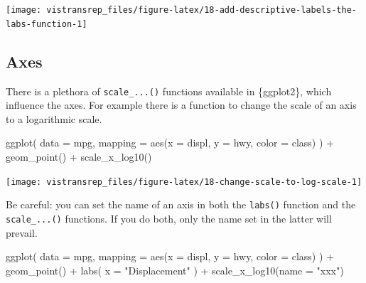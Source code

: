 \documentclass[]{book}
\newenvironment{Shaded}{}{}
\newcommand{\DataTypeTok}[1]{#1}
\newcommand{\KeywordTok}[1]{\textcolor[rgb]{0.00,0.00,1.00}{#1}}
\newcommand{\NormalTok}[1]{#1}
\newcommand{\OperatorTok}[1]{#1}
\newcommand{\StringTok}[1]{\textcolor[rgb]{0.00,0.50,0.50}{#1}}
\begin{document}
\begin{flushright}\texttt{[image: vistransrep\_files/figure-latex/18-add-descriptive-labels-the-labs-function-1]} \end{flushright}

\hypertarget{axes}{%
\subsection{Axes}\label{axes}}

There is a plethora of \texttt{scale\_...()} functions available in \{ggplot2\}, which influence the axes.
For example there is a function to change the scale of an axis to a logarithmic scale.

\begin{Shaded}
\begin{Highlighting}[]
\KeywordTok{ggplot}\NormalTok{(}
  \DataTypeTok{data =}\NormalTok{ mpg,}
  \DataTypeTok{mapping =} \KeywordTok{aes}\NormalTok{(}\DataTypeTok{x =}\NormalTok{ displ, }\DataTypeTok{y =}\NormalTok{ hwy, }\DataTypeTok{color =}\NormalTok{ class)}
\NormalTok{) }\OperatorTok{+}
\StringTok{  }\KeywordTok{geom_point}\NormalTok{() }\OperatorTok{+}
\StringTok{  }\KeywordTok{scale_x_log10}\NormalTok{()}
\end{Highlighting}
\end{Shaded}

\begin{flushright}\texttt{[image: vistransrep\_files/figure-latex/18-change-scale-to-log-scale-1]} \end{flushright}

Be careful: you can set the name of an axis in both the \texttt{labs()} function and the \texttt{scale\_...()} functions.
If you do both, only the name set in the latter will prevail.

\begin{Shaded}
\begin{Highlighting}[]
\KeywordTok{ggplot}\NormalTok{(}
  \DataTypeTok{data =}\NormalTok{ mpg,}
  \DataTypeTok{mapping =} \KeywordTok{aes}\NormalTok{(}\DataTypeTok{x =}\NormalTok{ displ, }\DataTypeTok{y =}\NormalTok{ hwy, }\DataTypeTok{color =}\NormalTok{ class)}
\NormalTok{) }\OperatorTok{+}
\StringTok{  }\KeywordTok{geom_point}\NormalTok{() }\OperatorTok{+}
\StringTok{  }\KeywordTok{labs}\NormalTok{(}
    \DataTypeTok{x =} \StringTok{"Displacement"}
\NormalTok{  ) }\OperatorTok{+}
\StringTok{  }\KeywordTok{scale_x_log10}\NormalTok{(}\DataTypeTok{name =} \StringTok{"xxx"}\NormalTok{)}
\end{Highlighting}
\end{Shaded}
\end{document}
